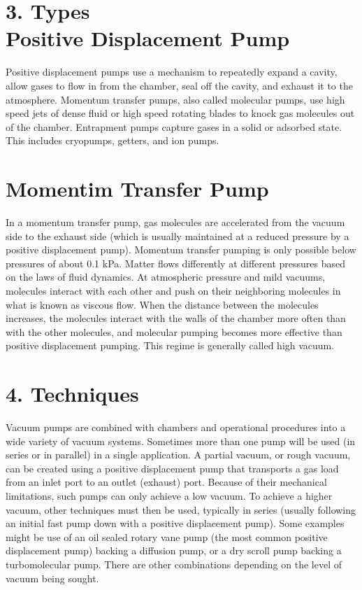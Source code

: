 \documentclass[12pt]{article}
\begin{document}
\section*{3.  Types\\ Positive Displacement Pump  }
Positive displacement pumps use a mechanism to repeatedly expand a cavity, allow gases to flow in from the chamber, seal off the cavity, and exhaust it to the atmosphere. Momentum transfer pumps, also called molecular pumps, use high speed jets of dense fluid or high speed rotating blades to knock gas molecules out of the chamber. Entrapment pumps capture gases in a solid or adsorbed state. This includes cryopumps, getters, and ion pumps.
 
 \section*{Momentim Transfer Pump }
 In a momentum transfer pump, gas molecules are accelerated from the vacuum side to the exhaust side (which is usually maintained at a reduced pressure by a positive displacement pump). Momentum transfer pumping is only possible below pressures of about 0.1 kPa. Matter flows differently at different pressures based on the laws of fluid dynamics. At atmospheric pressure and mild vacuums, molecules interact with each other and push on their neighboring molecules in what is known as viscous flow. When the distance between the molecules increases, the molecules interact with the walls of the chamber more often than with the other molecules, and molecular pumping becomes more effective than positive displacement pumping. This regime is generally called high vacuum.
 
\section*{4.  Techniques}
Vacuum pumps are combined with chambers and operational procedures into a wide variety of vacuum systems. Sometimes more than one pump will be used (in series or in parallel) in a single application. A partial vacuum, or rough vacuum, can be created using a positive displacement pump that transports a gas load from an inlet port to an outlet (exhaust) port. Because of their mechanical limitations, such pumps can only achieve a low vacuum. To achieve a higher vacuum, other techniques must then be used, typically in series (usually following an initial fast pump down with a positive displacement pump). Some examples might be use of an oil sealed rotary vane pump (the most common positive displacement pump) backing a diffusion pump, or a dry scroll pump backing a turbomolecular pump. There are other combinations depending on the level of vacuum being sought.
\end{document}
